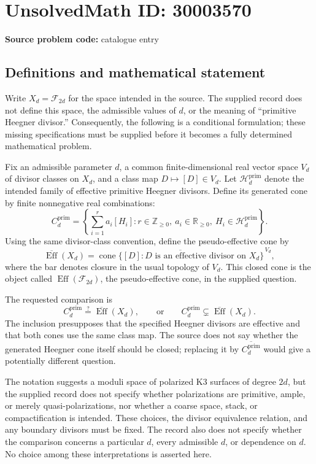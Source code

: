 \documentclass[11pt]{article}
\newcommand{\Z}{\mathbb{Z}}
\newcommand{\R}{\mathbb{R}}
\begin{document}
\section*{UnsolvedMath ID: 30003570}
\textbf{Source problem code:} catalogue entry
\subsection{Definitions and mathematical statement}
Write \(X_d=\mathcal F_{2d}\) for the space intended in the source. The supplied record does not define this space, the admissible values of \(d\), or the meaning of ``primitive Heegner divisor.'' Consequently, the following is a conditional formulation; these missing specifications must be supplied before it becomes a fully determined mathematical problem.

Fix an admissible parameter \(d\), a common finite-dimensional real vector space \(V_d\) of divisor classes on \(X_d\), and a class map \(D\mapsto[D]\in V_d\). Let \(\mathscr H_d^{\mathrm{prim}}\) denote the intended family of effective primitive Heegner divisors. Define its generated cone by finite nonnegative real combinations:
\[
 C_d^{\mathrm{prim}}
 =\left\{\sum_{i=1}^{r}a_i[H_i]:
 r\in\Z_{\geq0},\ a_i\in\R_{\geq0},\ H_i\in\mathscr H_d^{\mathrm{prim}}\right\}.
\]
Using the same divisor-class convention, define the pseudo-effective cone by
\[
 \overline{\operatorname{Eff}}(X_d)
 =\overline{\operatorname{cone}\{[D]:D\text{ is an effective divisor on }X_d\}}^{\,V_d},
\]
where the bar denotes closure in the usual topology of \(V_d\). This closed cone is the object called \(\operatorname{Eff}(\mathcal F_{2d})\), the pseudo-effective cone, in the supplied question.

The requested comparison is
\[
 C_d^{\mathrm{prim}}\stackrel{?}{=}
 \overline{\operatorname{Eff}}(X_d),
 \qquad\text{or}\qquad
 C_d^{\mathrm{prim}}\subsetneq
 \overline{\operatorname{Eff}}(X_d).
\]
The inclusion presupposes that the specified Heegner divisors are effective and that both cones use the same class map. The source does not say whether the generated Heegner cone itself should be closed; replacing it by \(\overline{C_d^{\mathrm{prim}}}\) would give a potentially different question.

The notation suggests a moduli space of polarized K3 surfaces of degree \(2d\), but the supplied record does not specify whether polarizations are primitive, ample, or merely quasi-polarizations, nor whether a coarse space, stack, or compactification is intended. These choices, the divisor equivalence relation, and any boundary divisors must be fixed. The record also does not specify whether the comparison concerns a particular \(d\), every admissible \(d\), or dependence on \(d\). No choice among these interpretations is asserted here.
\end{document}
